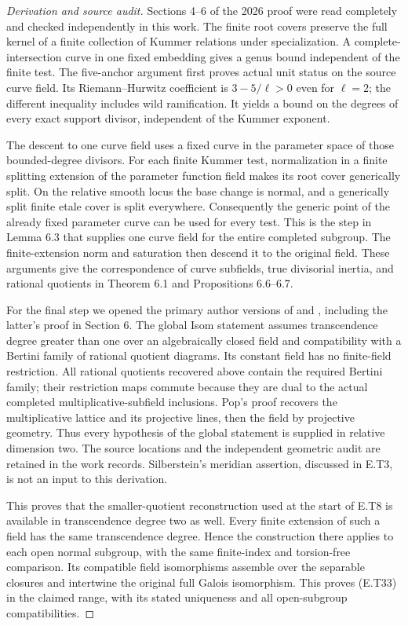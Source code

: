 \begin{proof}[Derivation and source audit]
Sections 4--6 of the 2026 proof were read completely and checked
independently in this work.  The finite root covers preserve
the full kernel of a finite collection of Kummer relations
under specialization.  A complete-intersection curve in one
fixed embedding gives a genus bound independent of the finite
test.  The five-anchor argument first proves actual unit
status on the source curve field.  Its Riemann--Hurwitz
coefficient is $3-5/\ell>0$ even for $\ell=2$; the different
inequality includes wild ramification.  It yields a bound on
the degrees of every exact support divisor, independent of
the Kummer exponent.

The descent to one curve field uses a fixed curve in the
parameter space of those bounded-degree divisors.  For each
finite Kummer test, normalization in a finite splitting
extension of the parameter function field makes its root cover
generically split.  On the relative smooth locus the base
change is normal, and a generically split finite etale cover
is split everywhere.  Consequently the generic point of the
already fixed parameter curve can be used for every test.
This is the step in Lemma 6.3 that supplies one curve field
for the entire completed subgroup.  The finite-extension
norm and saturation then descend it to the original field.
These arguments give the correspondence of curve subfields,
true divisorial inertia, and rational quotients in
Theorem 6.1 and Propositions 6.6--6.7.

For the final step we opened the primary author versions of
\cite[Theorem 2.1(2)]{Pop2012BogomolovI} and
\cite[Fact/Definition 43 and Theorem 45]{Pop2012DecompositionGraphs},
including the latter's proof in Section 6.  The global Isom
statement assumes transcendence degree greater than one over
an algebraically closed field and compatibility with a
Bertini family of rational quotient diagrams.  Its constant
field has no finite-field restriction.  All rational quotients
recovered above contain the required Bertini family; their
restriction maps commute because they are dual to the actual
completed multiplicative-subfield inclusions.  Pop's proof
recovers the multiplicative lattice and its projective lines,
then the field by projective geometry.  Thus every hypothesis
of the global statement is supplied in relative dimension two.
The source locations and the independent geometric audit are
retained in the work records.  Silberstein's meridian assertion,
discussed in E.T3, is not an input to this derivation.

This proves that the smaller-quotient reconstruction used at
the start of E.T8 is available in transcendence degree two as
well.  Every finite extension of such a field has the same
transcendence degree.  Hence the construction there applies to
each open normal subgroup, with the same finite-index and
torsion-free comparison.  Its compatible field isomorphisms
assemble over the separable closures and intertwine the
original full Galois isomorphism.  This proves (E.T33) in the
claimed range, with its stated uniqueness and all open-subgroup
compatibilities.


\end{proof}

